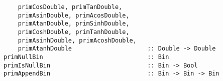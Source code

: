 \mbox{\tt \ \ \ \ primCosDouble,\ primTanDouble,}\\
\mbox{\tt \ \ \ \ primAsinDouble,\ primAcosDouble,}\\
\mbox{\tt \ \ \ \ primAtanDouble,\ primSinhDouble,}\\
\mbox{\tt \ \ \ \ primCoshDouble,\ primTanhDouble,}\\
\mbox{\tt \ \ \ \ primAsinhDouble,\ primAcoshDouble,}\\
\mbox{\tt \ \ \ \ primAtanhDouble\ \ \ \ \ \ \ \ \ \ \ \ \ \ \ \ \ \ \ \ \ ::\ Double\ ->\ Double}
\eprogB\noindent\bprogB
\mbox{\tt primNullBin\ \ \ \ \ \ \ \ \ \ \ \ \ \ \ \ \ \ \ \ \ \ \ \ \ \ \ \ \ ::\ Bin}\\
\mbox{\tt primIsNullBin\ \ \ \ \ \ \ \ \ \ \ \ \ \ \ \ \ \ \ \ \ \ \ \ \ \ \ ::\ Bin\ ->\ Bool}\\
\mbox{\tt primAppendBin\ \ \ \ \ \ \ \ \ \ \ \ \ \ \ \ \ \ \ \ \ \ \ \ \ \ \ ::\ Bin\ ->\ Bin\ ->\ Bin}
\eprogB
